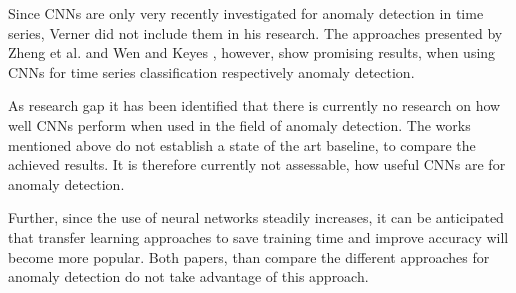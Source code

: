 Since CNNs are only very recently investigated for anomaly detection in time series, Verner did not include them in his research. The approaches presented by Zheng et al. \parencite*{Zheng2014} and Wen and Keyes \parencite*{Wen2019}, however, show promising results, when using CNNs for time series classification respectively anomaly detection. 

As research gap it has been identified that there is currently no research on how well CNNs perform when used in the field of anomaly detection. The works mentioned above do not establish a state of the art baseline, to compare the achieved results. It is therefore currently not assessable, how useful CNNs are for anomaly detection.

Further, since the use of neural networks steadily increases, it can be anticipated that transfer learning approaches to save training time and improve accuracy will become more popular. Both papers, than compare the different approaches for anomaly detection do not take advantage of this approach.

